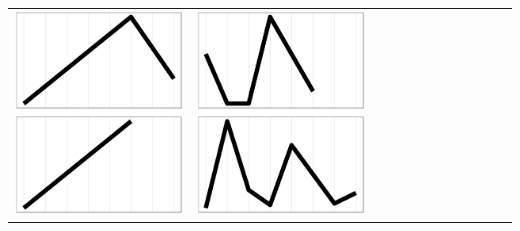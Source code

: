 \documentclass[conference]{IEEEtran}
\begin{document}
\begin{table}
\begin{tabular}{ | b{1.5cm} | c | c | c | c | c | c | c | c | c | c | c |}
 \includegraphics[scale=0.08]{figures/babc.ps} &  
 \includegraphics[scale=0.08]{figures/bbba.ps} &  

\end{tabular}
\end{table}
\end{document}
